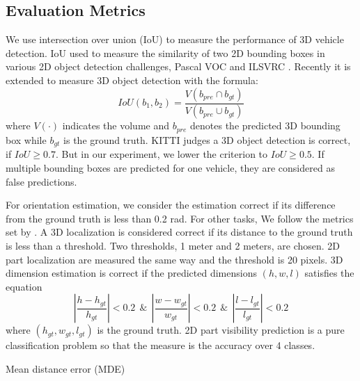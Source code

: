 \subsection{Evaluation Metrics}

We use intersection over union (IoU) to measure the performance of 3D vehicle detection. IoU used to measure the similarity of two 2D bounding boxes in various 2D object detection challenges, \eg Pascal VOC \cite{Everingham15} and ILSVRC \cite{DBLP:Russakovsky14}. Recently it is extended to measure 3D object detection with the formula:
\begin{equation}
	IoU(b_1, b_2) = \frac{V(b_{pre}\cap b_{gt})}{V(b_{pre}\cup b_{gt})}
\end{equation}
where $V(\cdot)$ indicates the volume and $b_{pre}$ denotes the predicted 3D bounding box while $b_{gt}$ is the ground truth. KITTI judges a 3D object detection is correct, if $IoU \geq 0.7$. But in our experiment, we lower the criterion to $IoU \geq 0.5$. If multiple bounding boxes are predicted for one vehicle, they are considered as false predictions.

For orientation estimation, we consider the estimation correct if its difference from the ground truth is less than 0.2 rad. For other tasks, We follow the metrics set by \cite{DBLP:journals/corr/ChabotCRTC17}. A 3D localization is considered correct if its distance to the ground truth is less than a threshold. Two thresholds, 1 meter and 2 meters, are chosen. 2D part localization are measured the same way and the threshold is 20 pixels. 3D dimension estimation is correct if the predicted dimensions $(h, w, l)$ satisfies the equation
\begin{equation}
	\left | \frac{h-h_{gt}}{h_{gt}} \right | < 0.2  ~~\&~~\left | \frac{w-w_{gt}}{w_{gt}} \right | < 0.2  ~~\&~~ \left | \frac{l-l_{gt}}{l_{gt}} \right | < 0.2
\end{equation}
where $(h_{gt}, w_{gt}, l_{gt})$ is the ground truth. 2D part visibility prediction is a pure classification problem so that the measure is the accuracy over 4 classes.

Mean distance error (MDE) \tbd

